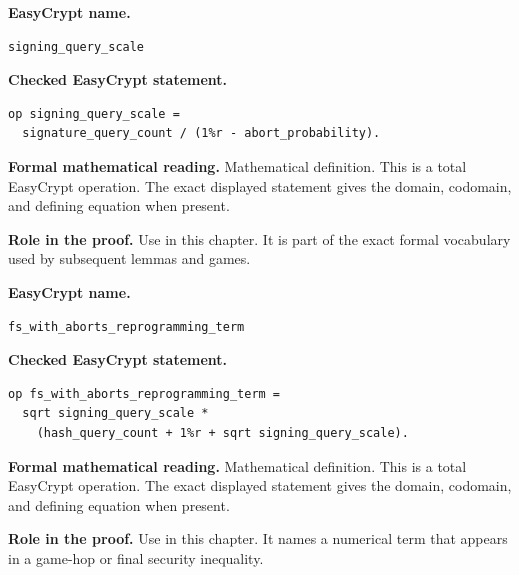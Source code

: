 \begin{formaldefinition}
\noindent\textbf{EasyCrypt name.}
\begin{lstlisting}[language=EasyCrypt,basicstyle=\ttfamily\scriptsize]
signing_query_scale
\end{lstlisting}
\noindent\textbf{Checked EasyCrypt statement.}
\begin{lstlisting}[language=EasyCrypt,basicstyle=\ttfamily\scriptsize]
op signing_query_scale =
  signature_query_count / (1%r - abort_probability).
\end{lstlisting}
\noindent\textbf{Formal mathematical reading.}
Mathematical definition. This is a total EasyCrypt operation.  The exact displayed statement gives the domain, codomain, and defining equation when present.

\noindent\textbf{Role in the proof.}
Use in this chapter. It is part of the exact formal vocabulary used by subsequent lemmas and games.

\end{formaldefinition}

\begin{formaldefinition}
\noindent\textbf{EasyCrypt name.}
\begin{lstlisting}[language=EasyCrypt,basicstyle=\ttfamily\scriptsize]
fs_with_aborts_reprogramming_term
\end{lstlisting}
\noindent\textbf{Checked EasyCrypt statement.}
\begin{lstlisting}[language=EasyCrypt,basicstyle=\ttfamily\scriptsize]
op fs_with_aborts_reprogramming_term =
  sqrt signing_query_scale *
    (hash_query_count + 1%r + sqrt signing_query_scale).
\end{lstlisting}
\noindent\textbf{Formal mathematical reading.}
Mathematical definition. This is a total EasyCrypt operation.  The exact displayed statement gives the domain, codomain, and defining equation when present.

\noindent\textbf{Role in the proof.}
Use in this chapter. It names a numerical term that appears in a game-hop or final security inequality.

\end{formaldefinition}

